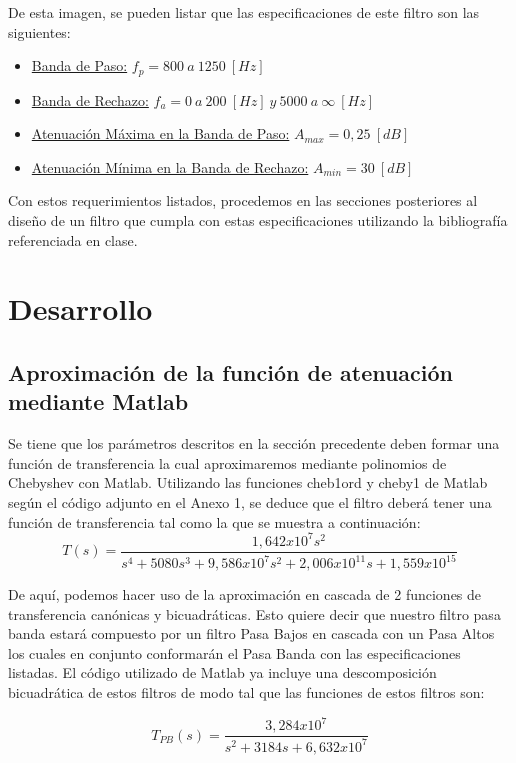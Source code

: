 \documentclass[12pt,a4paper]{article}
\begin{document}
De esta imagen, se pueden listar que las especificaciones de este filtro son las siguientes:
\begin{itemize}
    \item \underline{Banda de Paso:} $f_p = 800 \ a \ 1250 \ [Hz]$
    \item \underline{Banda de Rechazo:} $f_a = 0 \ a \ 200 \ [Hz] \ y \ 5000 \ a \ \infty \ [Hz]$
    \item \underline{Atenuación Máxima en la Banda de Paso:} $A_{max}= 0,25 \ [dB]$
    \item \underline{Atenuación Mínima en la Banda de Rechazo:} $A_{min} = 30 \ [dB]$
\end{itemize}

Con estos requerimientos listados, procedemos en las secciones posteriores al diseño de un filtro que cumpla con estas especificaciones utilizando la bibliografía referenciada en clase.



\section{Desarrollo}
\subsection{Aproximación de la función de atenuación mediante Matlab}
Se tiene que los parámetros descritos en la sección precedente deben formar una función de transferencia la cual aproximaremos mediante polinomios de Chebyshev con Matlab. Utilizando las funciones cheb1ord y cheby1 de Matlab según el código adjunto en el Anexo 1, se deduce que el filtro deberá tener una función de transferencia tal como la que se muestra a continuación: 
\begin{equation}
    \label{eq_1}
    T(s)= \frac{1,642x10^7 s^2}{s^4 + 5080 s^3 + 9,586x10^7 s^2 + 2,006x10^{11} s + 1,559x10^{15}}
\end{equation}

De aquí, podemos hacer uso de la aproximación en cascada de 2 funciones de transferencia canónicas y bicuadráticas. Esto quiere decir que nuestro filtro pasa banda estará compuesto por un filtro Pasa Bajos en cascada con un Pasa Altos los cuales en conjunto conformarán el Pasa Banda con las especificaciones listadas. El código utilizado de Matlab ya incluye una descomposición bicuadrática de estos filtros de modo tal que las funciones de estos filtros son:

\begin{equation}
    \label{eq_2}
    T_{PB}(s) = \frac{3,284x10^{7}}{s^2 + 3184s + 6,632x10^{7}}
\end{equation}
\end{document}
